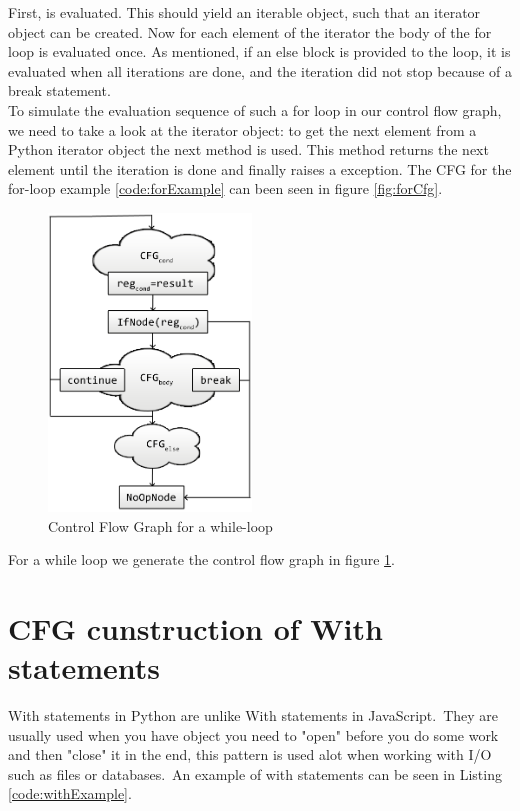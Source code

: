 First,  is evaluated. This should yield an iterable object, such that an iterator object can be created. Now for each element of the iterator the body of the for loop is evaluated once. As mentioned, if an else block is provided to the loop, it is evaluated when all iterations are done, and the iteration did not stop because of a break statement. \\
To simulate the evaluation sequence of such a for loop in our control flow graph, we need to take a look at the iterator object: to get the next element from a Python iterator object the next method is used. This method returns the next element until the iteration is done and finally raises a  exception. The CFG for the for-loop example \ref{code:forExample} can been seen in figure \ref{fig:forCfg}.

\begin{figure}
	\vspace{-20pt}
	\begin{center}
		\includegraphics[width=0.48\textwidth]{images/while.png}
	\end{center}
	\vspace{-10pt}
	\caption{Control Flow Graph for a while-loop}
	\label{fig:whileCfg}
	\vspace{-10pt}
\end{figure}
For a while loop we generate the control flow graph in figure \ref{fig:whileCfg}.

\section{CFG cunstruction of With statements}
With statements in Python are unlike With statements in JavaScript.\ They are usually used when you have object you need to "open" before you do some work and then "close" it in the end, this pattern is used alot when working with I/O such as files or databases.\ An example of with statements can be seen in Listing \ref{code:withExample}.


